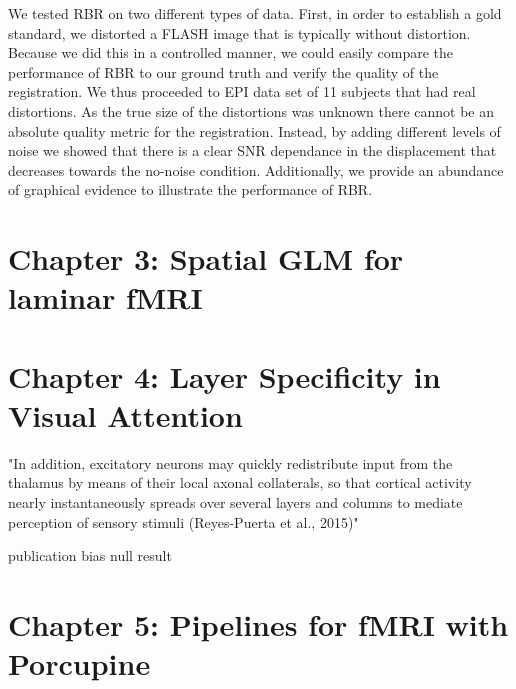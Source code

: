 We tested RBR on two different types of data. First, in order to establish a gold standard, we distorted a FLASH image that is typically without distortion. Because we did this in a controlled manner, we could easily compare the performance of RBR to our ground truth and verify the quality of the registration. We thus proceeded to EPI data set of 11 subjects that had real distortions. As the true size of the distortions was unknown there cannot be an absolute quality metric for the registration. Instead, by adding different levels of noise we showed that there is a clear SNR dependance in the displacement that decreases towards the no-noise condition. Additionally, we provide an abundance of graphical evidence to illustrate the performance of RBR. 

\section*{Chapter 3: Spatial GLM for laminar fMRI}
\section*{Chapter 4: Layer Specificity in Visual Attention}


"In addition, excitatory neurons may quickly redistribute input from the thalamus by means of their local axonal collaterals, 
so that cortical activity nearly instantaneously spreads over several layers and columns to mediate perception of sensory stimuli (Reyes-Puerta et al., 2015)"

publication bias 
null result


\section*{Chapter 5: Pipelines for fMRI with Porcupine}






\linespread{1.5}
\newpage
